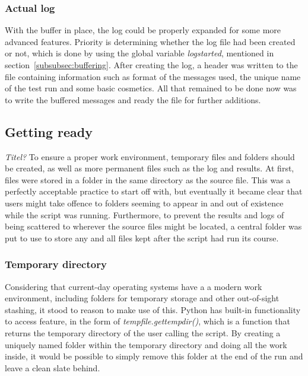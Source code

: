 \documentclass[11pt,british]{article}
\begin{document}
\subsubsection{Actual log}
With the buffer in place, the log could be properly expanded for some more advanced features. Priority is determining whether the log file had been created or not, which is done by using the global variable \emph{logstarted}, mentioned in section~\ref{subsubsec:buffering}. After creating the log, a header was written to the file containing information such as format of the messages used, the unique name of the test run and some basic cosmetics. All that remained to be done now was to write the buffered messages and ready the file for further additions.

\subsection{Getting ready}
\emph{\color{red} Titel?}
To ensure a proper work environment, temporary files and folders should be created, as well as more permanent files such as the log and results. At first, files were stored in a  folder in the same directory as the source file. This was a perfectly acceptable practice to start off with, but eventually it became clear that users might take offence to folders seeming to appear in and out of existence while the script was running. Furthermore, to prevent the results and logs of being scattered to wherever the source files might be located, a central folder was put to use to store any and all files kept after the script had run its course.

\subsubsection{Temporary directory}
Considering that current-day operating systems have a a modern work environment, including folders for temporary storage and other out-of-sight stashing, it stood to reason to make use of this. Python has built-in functionality to access feature, in the form of \emph{tempfile.gettempdir()}, which is a function that returns the temporary directory of the user calling the script. By creating a uniquely named folder within the temporary directory and doing all the work inside, it would be possible to simply remove this folder at the end of the run and leave a clean slate behind.
\end{document}
